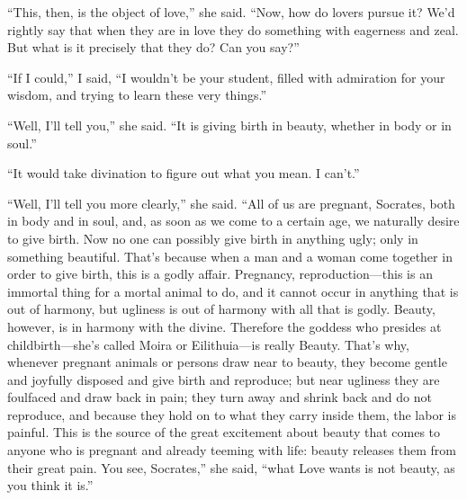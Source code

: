 “This, then, is the object of
love,” she said.
“Now, how do lovers pursue it? We'd rightly say that when they are in
love they do something with eagerness and zeal. But what is it precisely
that they do? Can you say?”

“If I could,” I said, “I wouldn't be your student, filled with
admiration for your wisdom, and trying to learn these very things.”

“Well, I'll tell you,” she said. “It is giving birth in
beauty, whether in
body or in soul.”

“It would take divination to figure out what you mean. I can't.” 

“Well, I'll tell you more clearly,” she said. “All of us are pregnant,
Socrates, both in body and in soul, and, as soon as we come to a certain
age, we naturally desire to give birth. Now no one can possibly give
birth in anything ugly; only in something beautiful. That's because when
a man and a woman come together in order to give birth, this is a godly
affair. Pregnancy, reproduction---this is an immortal thing for a mortal
animal to do, and it cannot occur in anything that is out of harmony,
but ugliness  is out of harmony with all that is godly. Beauty,
however, is in harmony with the divine. Therefore the goddess who
presides at childbirth---she's called Moira or Eilithuia---is really
Beauty. That's why,
whenever pregnant animals or persons draw near to beauty, they become
gentle and joyfully disposed and give birth and reproduce; but near
ugliness they are foulfaced and draw back in pain; they turn away and
shrink back and do not reproduce, and because they hold on to what they
carry inside them, the labor is painful. This is the source of the great
excitement about beauty  that comes to anyone who is pregnant and
already teeming with life: beauty releases them from their great pain.
You see, Socrates,” she said, “what Love wants is not beauty, as you
think it is.”

